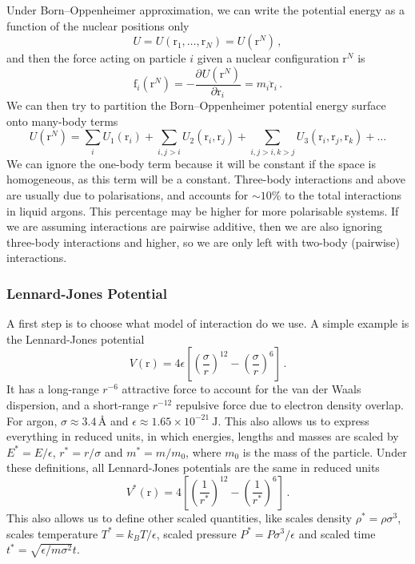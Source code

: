 \documentclass{article}
\theoremstyle{plain}\theoremheaderfont{\normalfont\itshape}\theorembodyfont{\rmfamily}\theoremseparator{.}\newtheorem*{rem}{Remark}\newtheorem*{ex}{Example}\newtheorem*{proof}{Proof}\newtheorem*{altp}{Alternative proof}
\theoremstyle{plain}\theoremheaderfont{\normalfont\bfseries}\theorembodyfont{\rmfamily}\theoremseparator{.}\newtheorem{thm}{Theorem}[section]\newtheorem{lem}[thm]{Lemma}\newtheorem{prop}[thm]{Proposition}\newtheorem*{cor}{Corollary}\newtheorem{defn}[thm]{Definition}\newtheorem{clm}[thm]{Claim}\newtheorem{clminproof}{Claim}\newtheorem{alg}[thm]{Algorithm}\newtheorem{hyp}[thm]{Hypothesis}\newtheorem{law}[thm]{Law}
\theoremstyle{break}\theoremheaderfont{\normalfont\itshape}\theorembodyfont{\rmfamily}\theoremseparator{.\medskip}\newtheorem*{proofskip}{Proof}\newtheorem*{exs}{Examples}\newtheorem*{rems}{Remarks}
\theoremstyle{break}\theoremheaderfont{\normalfont\bfseries}\theorembodyfont{\rmfamily}\theoremseparator{.\medskip}\newtheorem{lemskip}[thm]{Lemma}\newtheorem{defnskip}[thm]{Definition}\newtheorem{propskip}[thm]{Proposition}\newtheorem{thmskip}[thm]{Theorem}
\numberwithin{equation}{section}
\newcommand{\unit}[1]{\ \mathrm{#1}}
\newcommand{\pdv}[3][]{\frac{\partial^{#1} #2}{{\partial #3}^{#1}}}
\newcommand{\vb}[1]{\bm{\mathrm{#1}}}
\begin{document}
    Under Born--Oppenheimer approximation, we can write the potential energy as a function of the nuclear positions only
    \begin{equation}
        U=U(\vb{r}_1,\dots,\vb{r}_N)=U(\vb{r}^N)\,,
    \end{equation}
    and then the force acting on particle \(i\) given a nuclear configuration \(\vb{r}^N\) is
    \begin{equation}
        \vb{f}_i(\vb{r}^N)=-\pdv{U(\vb{r}^N)}{\vb{r}_i}=m_i\ddot{\vb{r}}_i\,.
    \end{equation}
    We can then try to partition the Born--Oppenheimer potential energy surface onto many-body terms
    \begin{equation}
        U(\vb{r}^N)=\sum_i U_1(\vb{r}_i)+\sum_{i,j>i}U_2(\vb{r}_i,\vb{r}_j)+\sum_{i,j>i,k>j}U_3(\vb{r}_i,\vb{r}_j,\vb{r}_k)+\dots
    \end{equation}
    We can ignore the one-body term because it will be constant if the space is homogeneous, as this term will be a constant. Three-body interactions and above are usually due to polarisations, and accounts for \(\sim 10\%\) to the total interactions in liquid argons. This percentage may be higher for more polarisable systems. If we are assuming interactions are pairwise additive, then we are also ignoring three-body interactions and higher, so we are only left with two-body (pairwise) interactions.

    \subsubsection{Lennard-Jones Potential}
    A first step is to choose what model of interaction do we use. A simple example is the Lennard-Jones potential
    \begin{equation}
        V(\vb{r})=4\epsilon\left[\left(\frac{\sigma}{r}\right)^{12}-\left(\frac{\sigma}{r}\right)^6\right]\,.
    \end{equation}
    It has a long-range \(r^{-6}\) attractive force to account for the van der Waals dispersion, and a short-range \(r^{-12}\) repulsive force due to electron density overlap. For argon, \(\sigma\approx 3.4\,\text{\AA}\) and \(\epsilon\approx 1.65\times 10^{-21}\unit{J}\). This also allows us to express everything in reduced units, in which energies, lengths and masses are scaled by \(E^*=E/\epsilon\), \(r^*=r/\sigma\) and \(m^*=m/m_0\), where \(m_0\) is the mass of the particle. Under these definitions, all Lennard-Jones potentials are the same in reduced units
    \begin{equation}
        V^*(\vb{r})=4\left[\left(\frac{1}{r^*}\right)^{12}-\left(\frac{1}{r^*}\right)^{6}\right]\,.
    \end{equation}
    This also allows us to define other scaled quantities, like scales density \(\rho^*=\rho\sigma^3\), scales temperature \(T^*=k_B T/\epsilon\), scaled pressure \(P^*=P\sigma^3/\epsilon\) and scaled time \(t^*=\sqrt{\epsilon/m\sigma^2}t\).
\end{document}

